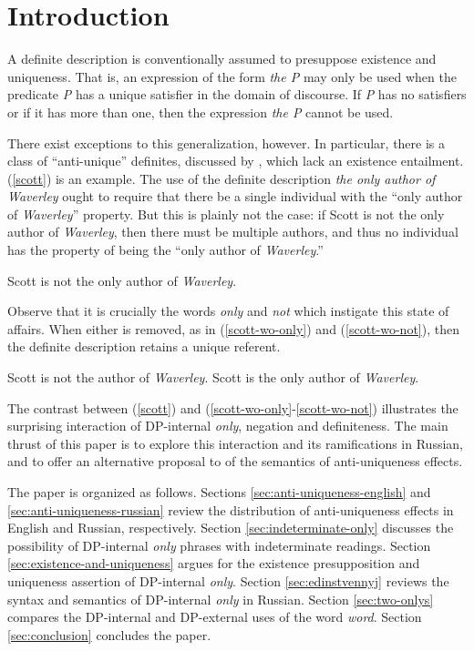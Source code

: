 \section{Introduction \label{sec:intro}}
A definite description is conventionally assumed to presuppose existence and uniqueness. That is, an expression of the form \textit{the P} may only be used when the predicate \textit{P} has a unique satisfier in the domain of discourse. If \textit{P} has no satisfiers or if it has more than one, then the expression \textit{the P} cannot be used.

There exist exceptions to this generalization, however. In particular, there is a class of ``anti-unique'' definites, discussed by \citet{cb2015}, which lack an existence entailment. (\ref{scott}) is an example. The use of the definite description \textit{the only author of Waverley} ought to require that there be a single individual with the ``only author of \textit{Waverley}'' property. But this is plainly not the case: if Scott is not the only author of \textit{Waverley}, then there must be multiple authors, and thus no individual has the property of being the ``only author of \textit{Waverley}.''

\begin{exe}
	\ex \label{scott} Scott is not the only author of \textit{Waverley}.
\end{exe}

Observe that it is crucially the words \textit{only} and \textit{not} which instigate this state of affairs. When either is removed, as in (\ref{scott-wo-only}) and (\ref{scott-wo-not}), then the definite description retains a unique referent.

\begin{exe}
	\ex \label{scott-wo-only} Scott is not the author of \textit{Waverley}.
	\ex \label{scott-wo-not} Scott is the only author of \textit{Waverley}.
\end{exe}

The contrast between (\ref{scott}) and (\ref{scott-wo-only}-\ref{scott-wo-not}) illustrates the surprising interaction of DP-internal \textit{only}, negation and definiteness. The main thrust of this paper is to explore this interaction and its ramifications in Russian, and to offer an alternative proposal to  of the semantics of anti-uniqueness effects.

The paper is organized as follows. Sections \ref{sec:anti-uniqueness-english} and \ref{sec:anti-uniqueness-russian} review the distribution of anti-uniqueness effects in English and Russian, respectively. Section \ref{sec:indeterminate-only} discusses the possibility of DP-internal \textit{only} phrases with indeterminate readings. Section \ref{sec:existence-and-uniqueness} argues for the existence presupposition and uniqueness assertion of DP-internal \textit{only}. Section \ref{sec:edinstvennyj} reviews the syntax and semantics of DP-internal \textit{only} in Russian. Section \ref{sec:two-onlys} compares the DP-internal and DP-external uses of the word \textit{word}. Section \ref{sec:conclusion} concludes the paper.